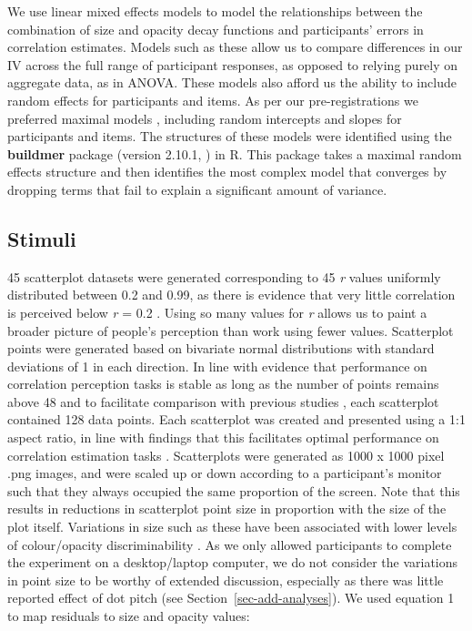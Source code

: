 \documentclass[manuscript, review, anonymous, screen]{acmart}
\begin{document}
We use linear mixed effects models to model the relationships between
the combination of size and opacity decay functions and participants'
errors in correlation estimates. Models such as these allow us to
compare differences in our IV across the full range of participant
responses, as opposed to relying purely on aggregate data, as in ANOVA.
These models also afford us the ability to include random effects for
participants and items. As per our pre-registrations we preferred
maximal models \citep{barr_2013}, including random intercepts and slopes
for participants and items. The structures of these models were
identified using the \textbf{buildmer} package (version 2.10.1,
\citep{voeten_buildmer}) in R. This package takes a maximal random
effects structure and then identifies the most complex model that
converges by dropping terms that fail to explain a significant amount of
variance.

\hypertarget{sec-scatter-gen}{%
\subsection{Stimuli}\label{sec-scatter-gen}}

45 scatterplot datasets were generated corresponding to 45 \emph{r}
values uniformly distributed between 0.2 and 0.99, as there is evidence
that very little correlation is perceived below \emph{r} = 0.2
\citep{strahan_1978, bobko_1979, cleveland_1982}. Using so many values
for \emph{r} allows us to paint a broader picture of people's perception
than work using fewer values. Scatterplot points were generated based on
bivariate normal distributions with standard deviations of 1 in each
direction. In line with evidence that performance on correlation
perception tasks is stable as long as the number of points remains above
48 \citep{rensink_2014} and to facilitate comparison with previous
studies \citep{strain_2023, strain_2023b}, each scatterplot contained
128 data points. Each scatterplot was created and presented using a 1:1
aspect ratio, in line with findings that this facilitates optimal
performance on correlation estimation tasks \citep{micallef_2017}.
Scatterplots were generated as 1000 x 1000 pixel .png images, and were
scaled up or down according to a participant's monitor such that they
always occupied the same proportion of the screen. Note that this
results in reductions in scatterplot point size in proportion with the
size of the plot itself. Variations in size such as these have been
associated with lower levels of colour/opacity discriminability
\citep{szafir_2018, smart_2019}. As we only allowed participants to
complete the experiment on a desktop/laptop computer, we do not consider
the variations in point size to be worthy of extended discussion,
especially as there was little reported effect of dot pitch (see
Section~\ref{sec-add-analyses}). We used equation 1 to map residuals to
size and opacity values:
\end{document}
